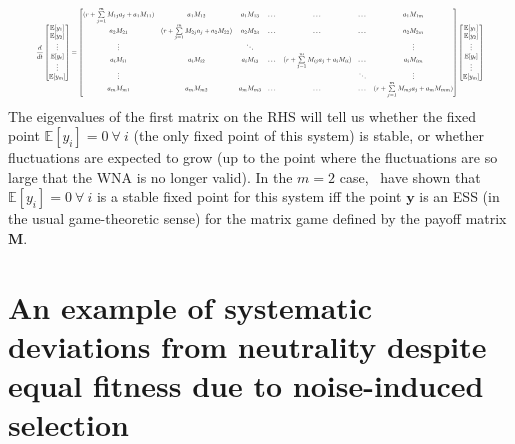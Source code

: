 \begin{equation}
\resizebox{0.93\textwidth}{!}{$\displaystyle
	\frac{d}{dt}\begin{bmatrix}
	\mathbb{E}[y_1]\\
	\mathbb{E}[y_2]\\
	\vdots\\
	\mathbb{E}[y_i]\\
	\vdots\\
	\mathbb{E}[y_m]
	\end{bmatrix}
	=
	\begin{bmatrix}
	(r + \sum\limits_{j=1}^{m}M_{1j}a_j + a_1M_{11}) & a_1M_{12} & a_1M_{13} & \dots & \dots & \dots & a_1M_{1m}\\
	a_2M_{21} & (r + \sum\limits_{j=1}^{m}M_{2j}a_j + a_2M_{22}) & a_2M_{23} & \dots & \dots & \dots & a_2M_{2m}\\
	\vdots &  & \ddots & &  & & \vdots\\
	a_{i}M_{i1} & a_iM_{i2} & a_iM_{i3} & \dots & (r + \sum\limits_{j=1}^{m}M_{ij}a_j + a_iM_{ii}) & \dots & a_iM_{im}\\
	\vdots &  &  & & & \ddots & \vdots\\
	a_mM_{m1} & a_mM_{m2} & a_mM_{m3} & \dots & \dots & \dots & (r + \sum\limits_{j=1}^{m}M_{mj}a_j + a_mM_{mm})
	\end{bmatrix}
	\begin{bmatrix}
	\mathbb{E}[y_1]\\
	\mathbb{E}[y_2]\\
	\vdots\\
	\mathbb{E}[y_i]\\
	\vdots\\
	\mathbb{E}[y_m]
	\end{bmatrix}
	$}
\end{equation}
The eigenvalues of the first matrix on the RHS will tell us whether the fixed point $\mathbb{E}[y_i] = 0 \ \forall \ i$ (the only fixed point of this system) is stable, or whether fluctuations are expected to grow (up to the point where the fluctuations are so large that the WNA is no longer valid). In the $m=2$ case,~\cite{tao_stochastic_2007} have shown that $\mathbb{E}[y_i] = 0 \ \forall \ i$ is a stable fixed point for this system iff the point $\mathbf{y}$ is an ESS (in the usual game-theoretic sense) for the matrix game defined by the payoff matrix $\mathbf{M}$.

\section{An example of systematic deviations from neutrality despite equal fitness due to noise-induced selection}\label{App_deviation_from_neutrality}

